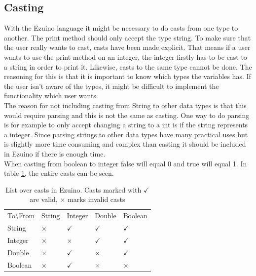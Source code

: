 \subsection*{Casting}
With the Ezuino language it might be necessary to do casts from one type to another.
The print method should only accept the type string. To make sure that the user really wants to cast, casts have been made explicit.
That means if a user wants to use the print method on an integer, the integer firstly has to be cast to a string in order to print it.
Likewise, casts to the same type cannot be done. The reasoning for this is that it is important to know which types the variables has. If the user isn't aware of the types, it might be difficult to implement the functionality which user wants.\\
The reason for not including casting from String to other data types is that this would require parsing and this is not the same as casting. One way to do parsing is for example to only accept changing a string to a int is if the string represents a integer. Since parsing strings to other data types have many practical uses but is slightly more time consuming and complex than casting it should be included in Ezuino if there is enough time.  \\
When casting from boolean to integer false will equal 0 and true will equal 1.
In table \ref{tab:cast-overview}, the entire casts can be seen.
\begin{table}[H]
\centering
\begin{tabular}{lllll}
To\textbackslash From & String   & Integer      & Double       & Boolean      \\
String                & $\times$ & $\checkmark$ & $\checkmark$ & $\checkmark$ \\
Integer               & $\times$ & $\times$     & $\checkmark$ & $\checkmark$ \\
Double                & $\times$ & $\checkmark$ & $\times$     & $\checkmark$ \\
Boolean               & $\times$ & $\checkmark$ & $\times$     & $\times$    
\end{tabular}
\caption{List over casts in Ezuino. Casts marked with $\checkmark$ are valid, $\times$ marks invalid casts}
\label{tab:cast-overview}
\end{table}